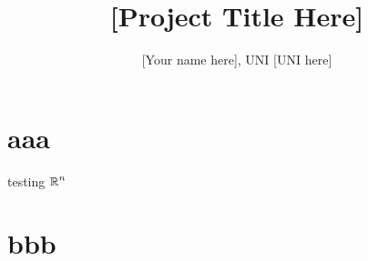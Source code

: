 \documentclass[11pt,letterpaper]{article}
\title{{\LARGE \bf [Project Title Here]}}
\author{[Your name here], UNI [UNI here]}
\date{}
\begin{document}
\pagestyle{plain}
\maketitle

\section{aaa}
testing ${\mbox{$\mathbb R$}}^n$
\section{bbb}
\end{document}
